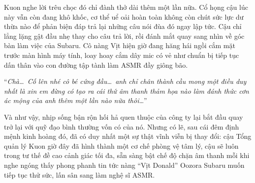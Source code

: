 \documentclass[../main.tex]{subfiles}
\begin{document}
Kuon nghe lời trêu chọc đó chỉ đành thở dài thêm một lần nữa. Cổ họng cậu lúc này vẫn còn đang khô khốc, cơ thể uể oải hoàn toàn không còn chút sức lực dư thừa nào để phản biện đáp trả lại những câu nói đùa đó ngay lập tức. Cậu chỉ lẳng lặng gật đầu nhẹ thay cho câu trả lời, rồi đánh mắt quay sang nhìn về góc bàn làm việc của Subaru. Cô nàng Vịt hiện giờ đang hăng hái ngồi cắm mặt trước màn hình máy tính, loay hoay cắm dây mic có vẻ như chuẩn bị tiếp tục dấn thân vào con đường tập tành làm ASMR đầy giông bão.

``\textit{Chà\dots\ Cố lên nhé cô bé cứng đầu\dots\ anh chỉ chân thành cầu mong một điều duy nhất là xin em đừng có tạo ra cái thứ âm thanh thảm họa nào làm đánh thức cơn ác mộng của anh thêm một lần nào nữa thôi\dots}''

Và như vậy, nhịp sống bận rộn hối hả quen thuộc của công ty lại bắt đầu quay trở lại với quỹ đạo bình thường vốn có của nó. Nhưng có lẽ, sau cái đêm định mệnh kinh hoàng đó, đã có duy nhất một sự thật vĩnh viễn bị thay đổi: cậu Tổng quản lý Kuon giờ đây đã hình thành một cơ chế phòng vệ tâm lý, cậu sẽ luôn trong tư thế đề cao cảnh giác tối đa, sẵn sàng bật chế độ chặn âm thanh mỗi khi nghe ngóng thấy phong phanh tin tức nàng ``Vịt Donald'' Oozora Subaru muốn tiếp tục thử sức, lấn sân sang làm nghệ sĩ ASMR.
\end{document}
